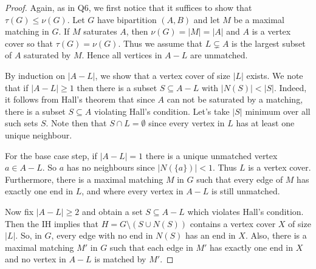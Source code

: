 \begin{proof}
Again, as in Q6, we first notice that it suffices to show that \( \tau (G) \leq \nu (G) \). Let \( G \) have bipartition \( (A,B) \) and let \( M \) be a maximal matching in \( G \). If \( M \) saturates \( A \), then \( \nu (G) = |M| = |A| \) and \( A \) is a vertex cover so that \( \tau (G) = \nu (G) \). Thus we assume that \( L \subsetneq A \) is the largest subset of \( A \) saturated by \( M \). Hence all vertices in \( A - L\) are unmatched. 

By induction on \( |A - L| \), we show that a vertex cover of size \( |L| \) exists. We note that if \( |A - L| \geq 1 \) then there is a subset \( S \subseteq A - L \) with \( |N(S)| < |S| \). Indeed, it follows from Hall's theorem that since \( A \) can not be saturated by a matching, there is a subset \( S \subseteq A \) violating Hall's condition. Let's take \( |S| \) minimum over all such sets \( S \). Note then that \( S \cap L = \emptyset  \) since every vertex in \( L \) has at least one unique neighbour.

For the base case step, if \( |A - L| = 1 \) there is a unique unmatched vertex \( a \in A - L \). So \( a \) has no neighbours since \( |N(\{ a \})| < 1 \). Thus \( L \) is a vertex cover. Furthermore, there is a maximal matching \( M \) in \( G \) such that every edge of \( M \) has exactly one end in \( L \), and where every vertex in \( A - L \) is still unmatched.

Now fix \( |A - L| \geq 2 \) and obtain a set \( S \subseteq A - L \) which violates Hall's condition. Then the IH implies that \( H = G \setminus (S \cup N(S)) \) contains a vertex cover \( X \) of size \( |L| \). So, in \( G \), every edge with no end in \( N(S) \) has an end in \( X \). Also, there is a maximal matching \( M' \) in \( G \) such that each edge in \( M' \) has exactly one end in \( X \) and no vertex in \( A - L \) is matched by \( M' \).


\end{proof}
